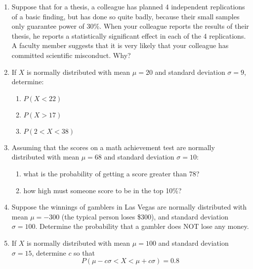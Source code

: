 \documentclass[10pt]{article}
\begin{document}
\begin{enumerate}
\item Suppose that for a thesis, a colleague has planned 4 independent replications of a basic finding, but has done so quite badly, because their small samples only guarantee power of 30\%.  When your colleague reports the results of their thesis, he reports a statistically significant effect in each of the 4 replications.  A faculty member suggests that it is very likely that your colleague has committed scientific misconduct.  Why?

\item If $X$ is normally distributed with mean $\mu=20$ and standard deviation $\sigma=9$, determine:
\begin{enumerate}
\item $P(X<22)$
\item $P(X>17)$
  \item $P(2<X<38)$
\end{enumerate}

\item Assuming that the scores on a math achievement test are normally distributed with mean $\mu=68$ and standard deviation $\sigma=10$:

\begin{enumerate}
\item what is the probability of getting a score greater than 78?
\item how high must someone score to be in the top 10\%?
\end{enumerate}

\item Suppose the winnings of gamblers in Las Vegas are normally distributed with mean $\mu=-300$ (the typical person loses \$300), and standard deviation $\sigma = 100$.  Determine the probability that a gambler does NOT lose any money.

\item If $X$ is normally distributed with mean $\mu=100$ and standard deviation $\sigma = 15$, determine $c$ so that
  \[
    P(\mu-c\sigma < X < \mu+c\sigma) = 0.8
  \]


\end{enumerate}
\end{document}
